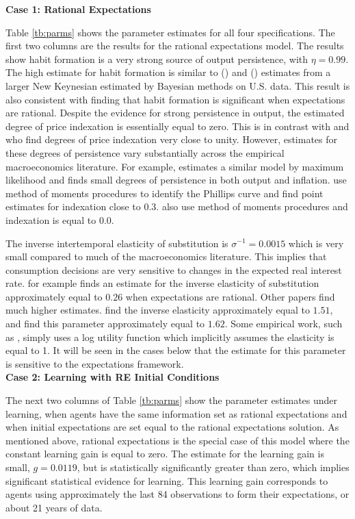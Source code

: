 \noindent \textbf{Case 1:  Rational Expectations}

Table \ref{tb:parms} shows the parameter estimates for all four specifications.  The first two columns are the results for the rational expectations model.  The results show habit formation is a very strong source of output persistence, with $\eta=0.99$.  The high estimate for habit formation is similar to  (\citeyear{smetswouters2005}) and (\citeyear{smetswouters2007}) estimates from a larger New Keynesian estimated by Bayesian methods on U.S. data.  This result is also consistent with  finding that habit formation is significant when expectations are rational.  Despite the evidence for strong persistence in output, the estimated degree of price indexation is essentially equal to zero.  This is in contrast with  and  who find degrees of price indexation very close to unity.  However, estimates for these degrees of persistence vary substantially across the empirical macroeconomics literature.  For example,  estimates a similar model by maximum likelihood and finds small degrees of persistence in both output and inflation.   use method of moments procedures to identify the Phillips curve and find point estimates for indexation close to 0.3.   also use method of moments procedures and indexation is equal to 0.0.

The inverse intertemporal elasticity of substitution is $\sigma^{-1}=0.0015$ which is very small compared to much of the macroeconomics literature.  This implies that consumption decisions are very sensitive to changes in the expected real interest rate.   for example finds an estimate for the inverse elasticity of substitution approximately equal to $0.26$ when expectations are rational.  Other papers find much higher estimates.   find the inverse elasticity approximately equal to $1.51$, and  find this parameter approximately equal to $1.62$.  Some empirical work, such as , simply uses a log utility function which implicitly assumes the elasticity is equal to 1.  It will be seen in the cases below that the estimate for this parameter is sensitive to the expectations framework.\\

\noindent \textbf{Case 2:  Learning with RE Initial Conditions}

The next two columns of Table \ref{tb:parms} show the parameter estimates under learning, when agents have the same information set as rational expectations and when initial expectations are set equal to the rational expectations solution.  As mentioned above, rational expectations is the special case of this model where the constant learning gain is equal to zero.  The estimate for the learning gain is small, $g=0.0119$, but is statistically significantly greater than zero, which implies significant statistical evidence for learning.  This learning gain corresponds to agents using approximately the last 84 observations to form their expectations, or about 21 years of data.  

